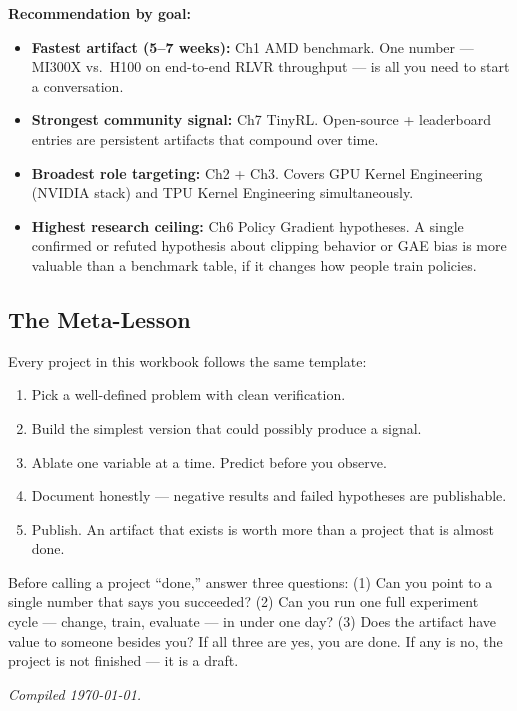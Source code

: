 \textbf{Recommendation by goal:}
\begin{itemize}
  \item \textbf{Fastest artifact (5--7 weeks):} Ch1 AMD benchmark. One number --- MI300X vs.\ H100 on end-to-end RLVR throughput --- is all you need to start a conversation.
  \item \textbf{Strongest community signal:} Ch7 TinyRL. Open-source + leaderboard entries are persistent artifacts that compound over time.
  \item \textbf{Broadest role targeting:} Ch2 + Ch3. Covers GPU Kernel Engineering (NVIDIA stack) and TPU Kernel Engineering simultaneously.
  \item \textbf{Highest research ceiling:} Ch6 Policy Gradient hypotheses. A single confirmed or refuted hypothesis about clipping behavior or GAE bias is more valuable than a benchmark table, if it changes how people train policies.
\end{itemize}

\subsection{The Meta-Lesson}

Every project in this workbook follows the same template:

\begin{enumerate}
  \item Pick a well-defined problem with clean verification.
  \item Build the simplest version that could possibly produce a signal.
  \item Ablate one variable at a time. Predict before you observe.
  \item Document honestly --- negative results and failed hypotheses are publishable.
  \item Publish. An artifact that exists is worth more than a project that is almost done.
\end{enumerate}

Before calling a project ``done,'' answer three questions: (1) Can you point to a single number that says you succeeded? (2) Can you run one full experiment cycle --- change, train, evaluate --- in under one day? (3) Does the artifact have value to someone besides you? If all three are yes, you are done. If any is no, the project is not finished --- it is a draft.

\vfill
\begin{center}
\small\textit{Compiled \today.}
\end{center}

